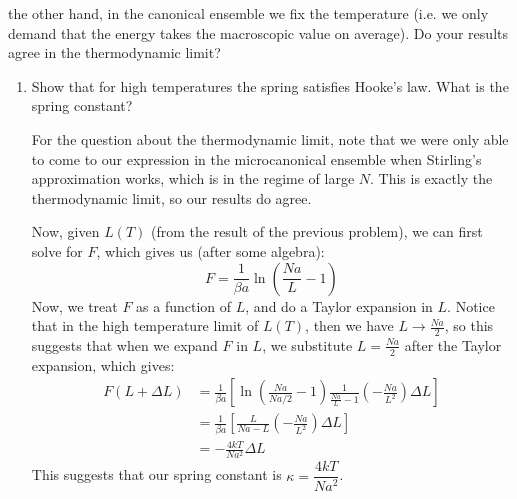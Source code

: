 \documentclass[10pt]{article}
\begin{document}
	the other hand, in the canonical ensemble we fix the temperature (i.e. we only demand that the energy 
	takes the macroscopic value on average). Do your results agree in the thermodynamic limit?
	\begin{enumerate}[label=\alph*), resume]
		\item Show that for high temperatures the spring satisfies Hooke's law. What is the spring 
			constant? 

			\begin{solution}
				For the question about the thermodynamic limit, note that we were only able to come to our 
				expression in the microcanonical ensemble when Stirling's approximation works, which is 
				in the regime of large \(N\). This is exactly the thermodynamic limit, so our results do agree. 

				Now, given \(L(T)\) (from the result of the previous problem), we can first solve for \(F\), 
				which gives us (after some algebra):
				\[
				F = \frac{1}{\beta a} \ln \left( \frac{Na}{L} - 1\right)
				\] 
				Now, we treat \(F\) as a function of \(L\), and do a Taylor expansion in \(L\). Notice that 
				in the high temperature limit of \(L(T)\), then we have \(L \to \frac{Na}{2}\), so this 
				suggests that when we expand \(F\) in \(L\), we substitute \(L = \frac{Na}{2}\) after the 
				Taylor expansion, which gives:
				\begin{align*}
					F(L + \Delta L) &= \frac{1}{\beta a}\left[ \ln \left( \frac{Na}{Na / 2} - 1 \right) 
					\frac{1}{ \frac{Na}{L} - 1} \left( -\frac{Na}{L^2} \right) \Delta L\right]  \\
					&= \frac{1}{\beta a}\left[ \frac{L}{Na - L} \left( -\frac{Na}{L^2} \right) \Delta L \right]  \\
					&= -\frac{4kT}{Na^2} \Delta L 
				\end{align*}	
				This suggests that our spring constant is \(\kappa = \dfrac{4kT}{Na^2}\). 
			\end{solution}
	\end{enumerate}
	\pagebreak
\end{document}
